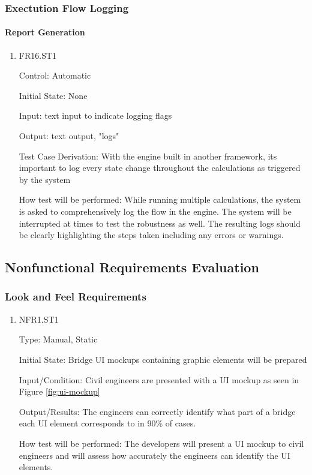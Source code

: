 \documentclass[12pt, titlepage]{article}
\begin{document}
\subsubsection{Exectution Flow Logging}

\paragraph{Report Generation}

\begin{enumerate}

\item{FR16.ST1\\}

Control: Automatic
					
Initial State: None
					
Input: text input to indicate logging flags 
					
Output: text output, "logs"

Test Case Derivation: With the engine built in another framework, its important to log every state change throughout the calculations as triggered by the system

How test will be performed: While running multiple calculations, the system is asked to comprehensively log the flow in the engine. The system will be interrupted at times to test the robustness as well. The resulting logs should be clearly highlighting the steps taken including any errors or warnings.
					
\end{enumerate}

\subsection{Nonfunctional Requirements Evaluation}

\subsubsection{Look and Feel Requirements}

\begin{enumerate}

\item{NFR1.ST1\\}

Type: Manual, Static

Initial State: Bridge UI mockups containing graphic elements will be prepared

Input/Condition: Civil engineers are presented with a UI mockup as seen in Figure \ref{fig:ui-mockup} 

Output/Results: The engineers can correctly identify what part of a bridge each UI element corresponds to in 90\% of cases.

How test will be performed: The developers will present a UI mockup to civil engineers and will assess how accurately the engineers can identify the UI elements.

\end{enumerate}
\end{document}
